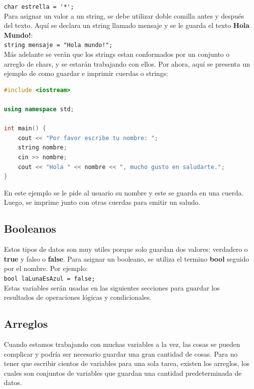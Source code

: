 \documentclass{article}
\begin{document}
\lstinline{char estrella = '*';} \\

Para asignar un valor a un string, se debe utilizar doble comilla antes y después del texto. Aquí se declara un string llamado mensaje y se le guarda el texto \textbf{Hola Mundo!}: \\

\lstinline{string mensaje = "Hola mundo!";} \\

Más adelante se verán que los strings estan conformados por un conjunto o arreglo de chars, y se estarán trabajando con ellos. Por ahora, aquí se presenta un ejemplo de como guardar e imprimir cuerdas o strings:

\begin{lstlisting}[language=C++, title=Usando strings]
#include <iostream>

using namespace std;

int main() {
	cout << "Por favor escribe tu nombre: ";
	string nombre;
	cin >> nombre;
	cout << "Hola " << nombre << ", mucho gusto en saludarte.";
}
\end{lstlisting}

En este ejemplo se le pide al usuario su nombre y este se guarda en una cuerda. Luego, se imprime junto con otras cuerdas para emitir un saludo.

\subsection{Booleanos}

Estos tipos de datos son muy utiles porque solo guardan dos valores: verdadero o \textbf{true} y falso o \textbf{false}. Para asignar un booleano, se utiliza el termino \textbf{bool} seguido por el nombre. Por ejemplo: \\

\lstinline{bool laLunaEsAzul = false;} \\

Estas variables serán usadas en las siguientes secciones para guardar los resultados de operaciones lógicas y condicionales.

\subsection{Arreglos}

Cuando estamos trabajando con muchas variables a la vez, las cosas se pueden complicar y podría ser necesario guardar una gran cantidad de cosas. Para no tener que escribir cientos de variables para una sola tarea, existen los arreglos, los cuales son conjuntos de variables que guardan una cantidad predeterminada de datos.
\end{document}
